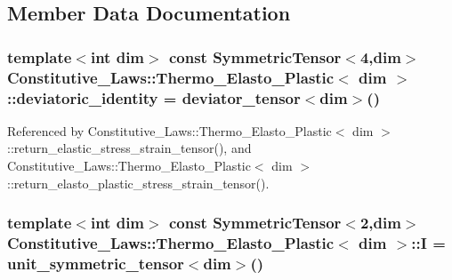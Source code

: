 \subsection{Member Data Documentation}
\subsubsection[{\texorpdfstring{deviatoric\+\_\+identity}{deviatoric_identity}}]{\setlength{\rightskip}{0pt plus 5cm}template$<$int dim$>$ const Symmetric\+Tensor$<$4,dim$>$ {\bf Constitutive\+\_\+\+Laws\+::\+Thermo\+\_\+\+Elasto\+\_\+\+Plastic}$<$ dim $>$\+::deviatoric\+\_\+identity = deviator\+\_\+tensor$<$dim$>$()\hspace{0.3cm}{\ttfamily [private]}}\hypertarget{classConstitutive__Laws_1_1Thermo__Elasto__Plastic_a5d88bd28aa5b3e74707ebb49de884755}{}\label{classConstitutive__Laws_1_1Thermo__Elasto__Plastic_a5d88bd28aa5b3e74707ebb49de884755}


Referenced by Constitutive\+\_\+\+Laws\+::\+Thermo\+\_\+\+Elasto\+\_\+\+Plastic$<$ dim $>$\+::return\+\_\+elastic\+\_\+stress\+\_\+strain\+\_\+tensor(), and Constitutive\+\_\+\+Laws\+::\+Thermo\+\_\+\+Elasto\+\_\+\+Plastic$<$ dim $>$\+::return\+\_\+elasto\+\_\+plastic\+\_\+stress\+\_\+strain\+\_\+tensor().

\subsubsection[{\texorpdfstring{I}{I}}]{\setlength{\rightskip}{0pt plus 5cm}template$<$int dim$>$ const Symmetric\+Tensor$<$2,dim$>$ {\bf Constitutive\+\_\+\+Laws\+::\+Thermo\+\_\+\+Elasto\+\_\+\+Plastic}$<$ dim $>$\+::I = unit\+\_\+symmetric\+\_\+tensor$<$dim$>$()\hspace{0.3cm}{\ttfamily [private]}}\hypertarget{classConstitutive__Laws_1_1Thermo__Elasto__Plastic_a82407b5024a6bdd7dc424dfa3562acf6}{}\label{classConstitutive__Laws_1_1Thermo__Elasto__Plastic_a82407b5024a6bdd7dc424dfa3562acf6}


